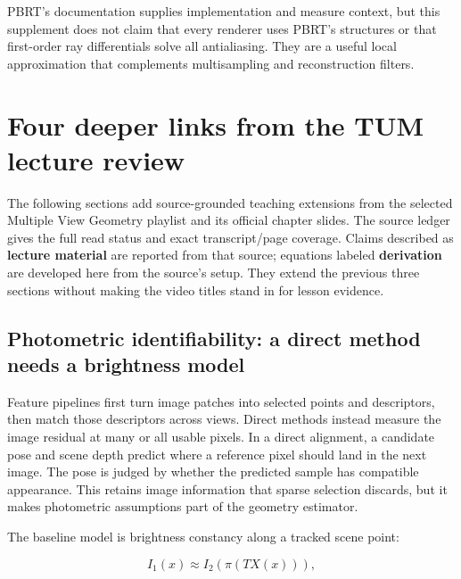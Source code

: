 PBRT's documentation supplies implementation and measure context, but this supplement does not claim that every renderer uses PBRT's structures or that first-order ray differentials solve all antialiasing. They are a useful local approximation that complements multisampling and reconstruction filters.

\section{Four deeper links from the TUM lecture review}\label{02-foundations-ii-ch036-four-deeper-links-from-the-tum-lecture-review}

\hypertarget{02-foundations-ii-ch036-four-deeper-links-from-the-tum-lecture-review}{}

The following sections add source-grounded teaching extensions from the selected Multiple View Geometry playlist and its official chapter slides. The source ledger gives the full read status and exact transcript/page coverage. Claims described as \textbf{lecture material} are reported from that source; equations labeled \textbf{derivation} are developed here from the source's setup. They extend the previous three sections without making the video titles stand in for lesson evidence.

\subsection{Photometric identifiability: a direct method needs a brightness model}\label{02-foundations-ii-ch036-photometric-identifiability-a-direct-method-needs-a-brightness-model}

\hypertarget{02-foundations-ii-ch036-photometric-identifiability-a-direct-method-needs-a-brightness-model}{}

Feature pipelines first turn image patches into selected points and descriptors, then match those descriptors across views. Direct methods instead measure the image residual at many or all usable pixels. In a direct alignment, a candidate pose and scene depth predict where a reference pixel should land in the next image. The pose is judged by whether the predicted sample has compatible appearance. This retains image information that sparse selection discards, but it makes photometric assumptions part of the geometry estimator.

The baseline model is brightness constancy along a tracked scene point:

\[
I_1(x) \approx I_2\!\left(\pi(TX(x))\right),
\]

